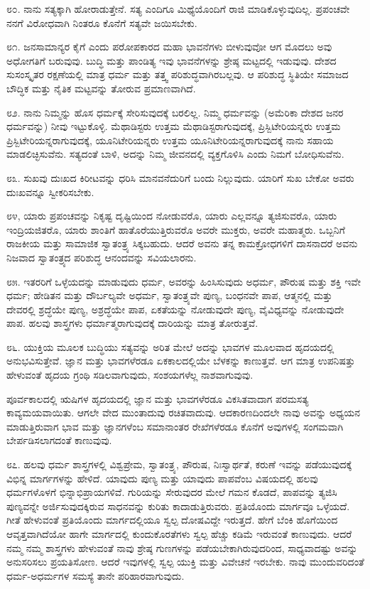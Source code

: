 ೮೦. ನಾನು ಸತ್ಯಕ್ಕಾಗಿ ಹೋರಾಡುತ್ತೇನೆ. ಸತ್ಯ ಎಂದಿಗೂ ಮಿಥ್ಯೆಯೊಂದಿಗೆ ರಾಜಿ ಮಾಡಿಕೊಳ್ಳುವುದಿಲ್ಲ. ಪ್ರಪಂಚವೇ ನನಗೆ ವಿರೋಧವಾಗಿ ನಿಂತರೂ ಕೊನೆಗೆ ಸತ್ಯವೇ ಜಯಿಸಬೇಕು.

೮೧. ಜನಸಾಮಾನ್ಯರ ಕೈಗೆ ಎಂದು ಪರೋಪಕಾರದ ಮಹಾ ಭಾವನೆಗಳು ಬೀಳುವುವೋ ಆಗ ಮೊದಲು ಅವು ಅಧೋಗತಿಗೆ ಬರುವುವು. ಬುದ್ಧಿ ಮತ್ತು ಪಾಂಡಿತ್ಯ ಇವು ಭಾವನೆಗಳನ್ನು ಶ್ರೇಷ್ಠ ಮಟ್ಟದಲ್ಲಿ ಇಡುವುವು. ದೇಶದ ಸುಸಂಸ್ಕೃತರ ರಕ್ಷಣೆಯಲ್ಲಿ ಮಾತ್ರ ಧರ್ಮ ಮತ್ತು ತತ್ತ್ವ ಪರಿಶುದ್ಧವಾಗಿರಬಲ್ಲವು. ಆ ಪರಿಶುದ್ಧ ಸ್ಥಿತಿಯೇ ಸಮಾಜದ ಬೌದ್ಧಿಕ ಮತ್ತು ನೈತಿಕ ಮಟ್ಟವನ್ನು ತೋರುವ ಪ್ರಮಾಣವಾಗಿದೆ.

೮೨. ನಾನು ನಿಮ್ಮನ್ನು ಹೊಸ ಧರ್ಮಕ್ಕೆ ಸೇರಿಸುವುದಕ್ಕೆ ಬರಲಿಲ್ಲ. ನಿಮ್ಮ ಧರ್ಮವನ್ನು (ಅಮೆರಿಕಾ ದೇಶದ ಜನರ ಧರ್ಮವನ್ನು) ನೀವು ಇಟ್ಟುಕೊಳ್ಳಿ. ಮೆಥಾಡಿಸ್ಟರು ಉತ್ತಮ ಮೆಥಾಡಿಸ್ಟರಾಗುವುದಕ್ಕೆ, ಪ್ರಿಸ್ಬಿಟೇರಿಯನ್ನರು ಉತ್ತಮ ಪ್ರಿಸ್ಬಿಟೇರಿಯನ್ನರಾಗುವುದಕ್ಕೆ, ಯೂನಿಟೇರಿಯನ್ನರು ಉತ್ತಮ ಯೂನಿಟೇರಿಯನ್ನರಾಗುವುದಕ್ಕೆ ನಾನು ಸಹಾಯ ಮಾಡಲಿಚ್ಛಿಸುವೆನು. ಸತ್ಯದಂತೆ ಬಾಳಿ, ಅದನ್ನು ನಿಮ್ಮ ಜೀವನದಲ್ಲಿ ವ್ಯಕ್ತಗೊಳಿಸಿ ಎಂದು ನಿಮಗೆ ಬೋಧಿಸುವೆನು.

೮೩. ಸುಖವು ದುಃಖದ ಕಿರೀಟವನ್ನು ಧರಿಸಿ ಮಾನವನೆದುರಿಗೆ ಬಂದು ನಿಲ್ಲುವುದು. ಯಾರಿಗೆ ಸುಖ ಬೇಕೋ ಅವರು ದುಃಖವನ್ನೂ ಸ್ವೀಕರಿಸಬೇಕು.

೮೪, ಯಾರು ಪ್ರಪಂಚವನ್ನು ನಿಕೃಷ್ಟ ದೃಷ್ಟಿಯಿಂದ ನೋಡುವರೊ, ಯಾರು ಎಲ್ಲವನ್ನೂ ತ್ಯಜಿಸುವರೊ, ಯಾರು ಇಂದ್ರಿಯಜಿತರೊ, ಯಾರು ಶಾಂತಿಗೆ ಹಾತೊರೆಯುತ್ತಿರುವರೊ ಅವರೇ ಮುಕ್ತರು, ಅವರೇ ಮಹಾತ್ಮರು. ಒಬ್ಬನಿಗೆ ರಾಜಕೀಯ ಮತ್ತು ಸಾಮಾಜಿಕ ಸ್ವಾತಂತ್ರ್ಯ ಸಿಕ್ಕಬಹುದು. ಆದರೆ ಅವನು ತನ್ನ ಕಾಮಕ್ರೋಧಗಳಿಗೆ ದಾಸನಾದರೆ ಅವನು ನಿಜವಾದ ಸ್ವಾತಂತ್ರ್ಯದ ಪರಿಶುದ್ಧ ಆನಂದವನ್ನು ಸವಿಯಲಾರನು.

೮೫. ಇತರರಿಗೆ ಒಳ್ಳೆಯದನ್ನು ಮಾಡುವುದು ಧರ್ಮ, ಅವರನ್ನು ಹಿಂಸಿಸುವುದು ಅಧರ್ಮ, ಪೌರುಷ ಮತ್ತು ಶಕ್ತಿ ಇವೇ ಧರ್ಮ; ಹೇಡಿತನ ಮತ್ತು ದೌರ್ಬಲ್ಯವೇ ಅಧರ್ಮ, ಸ್ವಾತಂತ್ರ್ಯವೇ ಪುಣ್ಯ, ಬಂಧನವೇ ಪಾಪ, ಆತ್ಮನಲ್ಲಿ ಮತ್ತು ದೇವರಲ್ಲಿ ಶ್ರದ್ಧೆಯೇ ಪುಣ್ಯ, ಅಶ್ರದ್ಧೆಯೇ ಪಾಪ, ಏಕತೆಯನ್ನು ನೋಡುವುದೇ ಪುಣ್ಯ, ವೈವಿಧ್ಯವನ್ನು ನೋಡುವುದೇ ಪಾಪ. ಹಲವು ಶಾಸ್ತ್ರಗಳು ಧರ್ಮಾತ್ಮರಾಗುವುದಕ್ಕೆ ದಾರಿಯನ್ನು ಮಾತ್ರ ತೋರುತ್ತವೆ.

೮೬. ಯುಕ್ತಿಯ ಮೂಲಕ ಬುದ್ಧಿಯು ಸತ್ಯವನ್ನು ಅರಿತ ಮೇಲೆ ಅದನ್ನು ಭಾವಗಳ  ಮೂಲವಾದ ಹೃದಯದಲ್ಲಿ ಅನುಭವಿಸುತ್ತೇವೆ. ಜ್ಞಾನ ಮತ್ತು ಭಾವಗಳೆರಡೂ ಏಕಕಾಲದಲ್ಲಿಯೇ ಬೆಳಕನ್ನು ಕಾಣುತ್ತವೆ. ಆಗ ಮಾತ್ರ ಉಪನಿಷತ್ತು ಹೇಳುವಂತೆ ಹೃದಯ ಗ್ರಂಥಿ ಸಡಿಲವಾಗುವುದು, ಸಂಶಯಗಳೆಲ್ಲ ನಾಶವಾಗುವುವು.

ಪೂರ್ವಕಾಲದಲ್ಲಿ ಋಷಿಗಳ ಹೃದಯದಲ್ಲಿ ಜ್ಞಾನ ಮತ್ತು ಭಾವಗಳೆರಡೂ ವಿಕಸಿತವಾದಾಗ ಪರಮಸತ್ಯ ಕಾವ್ಯಮಯವಾಯಿತು. ಆಗಲೇ ವೇದ ಮುಂತಾದುವು ರಚಿತವಾದುವು. ಆದಕಾರಣದಿಂದಲೇ ನಾವು ಅವನ್ನು ಅಧ್ಯಯನ ಮಾಡುತ್ತಿರುವಾಗ ಭಾವ ಮತ್ತು ಜ್ಞಾನಗಳೆಂಬ ಸಮಾನಾಂತರ ರೇಖೆಗಳೆರಡೂ ಕೊನೆಗೆ ಅವುಗಳಲ್ಲಿ ಸಂಗಮವಾಗಿ ಬೇರ್ಪಡಿಸಲಾಗದಂತೆ ಕಾಣುವುವು.

೮೭. ಹಲವು ಧರ್ಮ ಶಾಸ್ತ್ರಗಳಲ್ಲಿ ವಿಶ್ವಪ್ರೇಮ, ಸ್ವಾತಂತ್ರ್ಯ, ಪೌರುಷ, ನಿಃಸ್ವಾರ್ಥತೆ, ಕರುಣೆ ಇವನ್ನು ಪಡೆಯುವುದಕ್ಕೆ ವಿಭಿನ್ನ ಮಾರ್ಗಗಳನ್ನು ಹೇಳಿದೆ. ಯಾವುದು ಪುಣ್ಯ ಮತ್ತು ಯಾವುದು ಪಾಪವೆಂಬ ವಿಷಯದಲ್ಲಿ ಹಲವು ಧರ್ಮಗಳೊಳಗೆ ಭಿನ್ನಾಭಿಪ್ರಾಯಗಳಿವೆ. ಗುರಿಯನ್ನು ಸೇರುವುದರ ಮೇಲೆ ಗಮನ ಕೊಡದೆ, ಪಾಪವನ್ನು ತ್ಯಜಿಸಿ ಪುಣ್ಯವನ್ನೇ ಅರ್ಜಿಸುವುದಕ್ಕಿರುವ ಸಾಧನವನ್ನು ಕುರಿತು ಕಾದಾಡುತ್ತಿರುವರು. ಪ್ರತಿಯೊಂದು ಮಾರ್ಗವೂ ಒಳ್ಳೆಯದೆ. ಗೀತೆ ಹೇಳುವಂತೆ ಪ್ರತಿಯೊಂದು ಮಾರ್ಗದಲ್ಲಿಯೂ ಸ್ವಲ್ಪ ದೋಷವಿದ್ದೇ ಇರುತ್ತದೆ. ಹೇಗೆ ಬೆಂಕಿ ಹೊಗೆಯಿಂದ ಆವೃತ್ತವಾಗಿದೆಯೋ ಹಾಗೇ ಮಾರ್ಗದಲ್ಲಿ ಕುಂದುಕೊರತೆಗಳು ಸ್ವಲ್ಪ ಹೆಚ್ಚು ಕಡಿಮೆ ಇರುವಂತೆ ಕಾಣುವುದು. ಆದರೆ ನಮ್ಮ ನಮ್ಮ ಶಾಸ್ತ್ರಗಳು ಹೇಳುವಂತೆ ನಾವು ಶ್ರೇಷ್ಠ ಗುಣಗಳನ್ನು ಪಡೆಯಬೇಕಾಗಿರುವುದರಿಂದ, ಸಾಧ್ಯವಾದಷ್ಟು ಅವನ್ನು ಅನುಸರಿಸಲು ಪ್ರಯತಿಸೋಣ. ಆದರೆ ಇವುಗಳಲ್ಲಿ ಸ್ವಲ್ಪ ಯುಕ್ತಿ ಮತ್ತು ವಿವೇಚನೆ ಇರಬೇಕು. ನಾವು ಮುಂದುವರಿದಂತೆ ಧರ್ಮ-ಅಧರ್ಮಗಳ ಸಮಸ್ಯೆ ತಾನೇ ಪರಿಹಾರವಾಗುವುದು.


